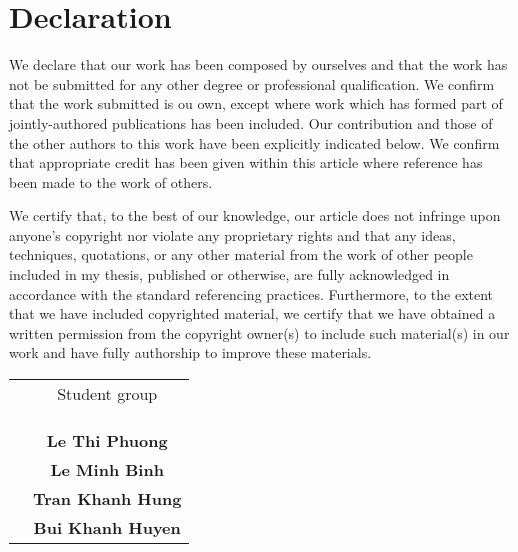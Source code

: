 \chapter*{Declaration}
We declare that our work has been composed by ourselves and that the work has not be submitted for any other degree or professional qualification.
We confirm that the work submitted is ou own, except where work which has formed part of jointly-authored publications has been included.
Our contribution and those of the other authors to this work have been explicitly indicated below.
We confirm that appropriate credit has been given within this article where reference has been made to the work of others.


We certify that, to the best of our knowledge, our article does not infringe upon anyone’s copyright nor violate any proprietary rights and that any ideas, techniques, quotations, or any other material from the work of other people included in my thesis, published or otherwise, are fully acknowledged in accordance with the standard referencing practices.
Furthermore, to the extent that we have included copyrighted material, we certify that we have obtained a written permission from the copyright owner(s) to include such material(s) in our work and have fully authorship to improve these materials.

\begin{table}[h]
\begin{tabular}{p{}c}
 & Student group \\
 &              \\
 &              \\
 &              \\
 & \textbf{Le Thi Phuong}\\
 & \textbf{Le Minh Binh}\\
 & \textbf{Tran Khanh Hung}\\
 & \textbf{Bui Khanh Huyen}
\end{tabular}
\end{table}